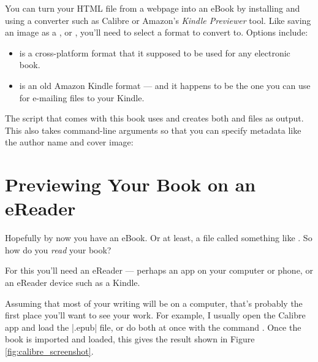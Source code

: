 You can turn your HTML file from a webpage into an eBook by installing
and using a converter such as Calibre  or
Amazon's {\em Kindle Previewer} tool.
Like saving an image as a
,  or , you'll need to select a
format to convert to. Options include:

\begin{itemize}
  \item {} is a cross-platform format that it supposed to
    be used for any electronic book.
  \item {} is an old Amazon Kindle format --- and it
    happens to be the one you can use for e-mailing files to your Kindle.
\end{itemize}

The  script that comes with this book uses
 and creates both  and
 files as output. This also takes command-line
arguments so that you can specify metadata like the author name
and cover image:

{\flushleft \quad {}}

\section{Previewing Your Book on an eReader}

Hopefully by now you have an eBook. Or at least, a file called something like
. So how do you {\em read} your book?

For this you'll need an eReader --- perhaps an app on your computer or phone,
or an eReader device such as a Kindle.

Assuming that most of your writing will be on a computer, that's
probably the first place you'll want to see your work. For example, I
usually open the Calibre app and load the \sverb|.epub| file, or do both at
once with the command . Once the book is imported and loaded, this gives 
the result shown in Figure \ref{fig:calibre_screenshot}.

